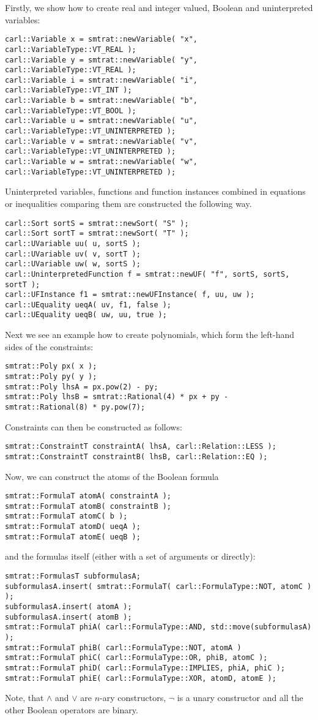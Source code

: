 Firstly, we show how to create real and integer valued, Boolean and uninterpreted variables:
\scriptsize
\begin{verbatim}
carl::Variable x = smtrat::newVariable( "x", carl::VariableType::VT_REAL );
carl::Variable y = smtrat::newVariable( "y", carl::VariableType::VT_REAL );
carl::Variable i = smtrat::newVariable( "i", carl::VariableType::VT_INT );
carl::Variable b = smtrat::newVariable( "b", carl::VariableType::VT_BOOL );
carl::Variable u = smtrat::newVariable( "u", carl::VariableType::VT_UNINTERPRETED );
carl::Variable v = smtrat::newVariable( "v", carl::VariableType::VT_UNINTERPRETED );
carl::Variable w = smtrat::newVariable( "w", carl::VariableType::VT_UNINTERPRETED );
\end{verbatim}
\normalsize
Uninterpreted variables, functions and function instances combined in equations or inequalities comparing them are constructed the following way.
\scriptsize
\begin{verbatim}
carl::Sort sortS = smtrat::newSort( "S" );
carl::Sort sortT = smtrat::newSort( "T" );
carl::UVariable uu( u, sortS );
carl::UVariable uv( v, sortT );
carl::UVariable uw( w, sortS );
carl::UninterpretedFunction f = smtrat::newUF( "f", sortS, sortS, sortT );
carl::UFInstance f1 = smtrat::newUFInstance( f, uu, uw );
carl::UEquality ueqA( uv, f1, false );
carl::UEquality ueqB( uw, uu, true );
\end{verbatim}
\normalsize
Next we see an example how to create polynomials, which form the left-hand sides of the constraints:
\scriptsize
\begin{verbatim}
smtrat::Poly px( x );
smtrat::Poly py( y );
smtrat::Poly lhsA = px.pow(2) - py;
smtrat::Poly lhsB = smtrat::Rational(4) * px + py - smtrat::Rational(8) * py.pow(7);
\end{verbatim}
\normalsize
Constraints can then be constructed as follows:
\scriptsize
\begin{verbatim}
smtrat::ConstraintT constraintA( lhsA, carl::Relation::LESS );
smtrat::ConstraintT constraintB( lhsB, carl::Relation::EQ );
\end{verbatim}
\normalsize
Now, we can construct the atoms of the Boolean formula
\scriptsize
\begin{verbatim}
smtrat::FormulaT atomA( constraintA );
smtrat::FormulaT atomB( constraintB );
smtrat::FormulaT atomC( b );
smtrat::FormulaT atomD( ueqA );
smtrat::FormulaT atomE( ueqB );
\end{verbatim}
\normalsize
and the formulas itself (either with a set of arguments or directly):
\scriptsize
\begin{verbatim}
smtrat::FormulasT subformulasA;
subformulasA.insert( smtrat::FormulaT( carl::FormulaType::NOT, atomC ) );
subformulasA.insert( atomA );
subformulasA.insert( atomB );
smtrat::FormulaT phiA( carl::FormulaType::AND, std::move(subformulasA) );
smtrat::FormulaT phiB( carl::FormulaType::NOT, atomA )
smtrat::FormulaT phiC( carl::FormulaType::OR, phiB, atomC );
smtrat::FormulaT phiD( carl::FormulaType::IMPLIES, phiA, phiC );
smtrat::FormulaT phiE( carl::FormulaType::XOR, atomD, atomE );
\end{verbatim}
\normalsize
Note, that $\land$ and $\lor$ are $n$-ary constructors, $\neg$ is a unary constructor and all the other Boolean operators are binary.

